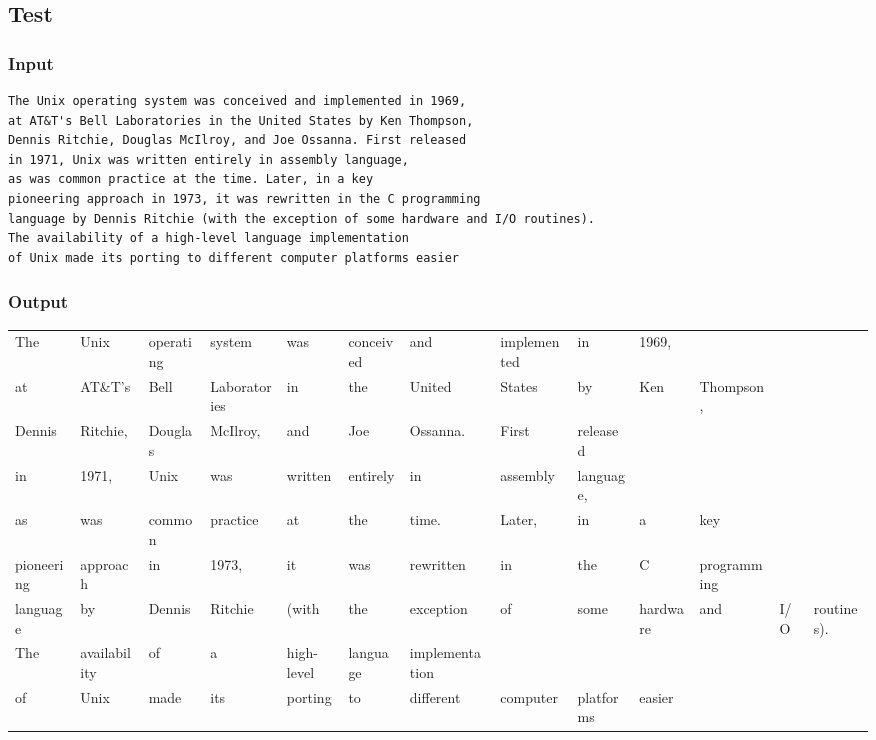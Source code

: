 \documentclass[11pt]{article}
\begin{document}
\subsection*{Test}
\label{sec-5-3}
\subsubsection*{Input}
\label{sec-5-3-1}

\begin{verbatim}
The Unix operating system was conceived and implemented in 1969,
at AT&T's Bell Laboratories in the United States by Ken Thompson, 
Dennis Ritchie, Douglas McIlroy, and Joe Ossanna. First released 
in 1971, Unix was written entirely in assembly language,
as was common practice at the time. Later, in a key 
pioneering approach in 1973, it was rewritten in the C programming 
language by Dennis Ritchie (with the exception of some hardware and I/O routines).
The availability of a high-level language implementation 
of Unix made its porting to different computer platforms easier
\end{verbatim}
\subsubsection*{Output}
\label{sec-5-3-2}
\begin{center}
\begin{tabular}{lllllllllllll}
The & Unix & operating & system & was & conceived & and & implemented & in & 1969, &  &  & \\
at & AT\&T's & Bell & Laboratories & in & the & United & States & by & Ken & Thompson, &  & \\
Dennis & Ritchie, & Douglas & McIlroy, & and & Joe & Ossanna. & First & released &  &  &  & \\
in & 1971, & Unix & was & written & entirely & in & assembly & language, &  &  &  & \\
as & was & common & practice & at & the & time. & Later, & in & a & key &  & \\
pioneering & approach & in & 1973, & it & was & rewritten & in & the & C & programming &  & \\
language & by & Dennis & Ritchie & (with & the & exception & of & some & hardware & and & I/O & routines).\\
The & availability & of & a & high-level & language & implementation &  &  &  &  &  & \\
of & Unix & made & its & porting & to & different & computer & platforms & easier &  &  & \\
\end{tabular}
\end{center}
\end{document}
